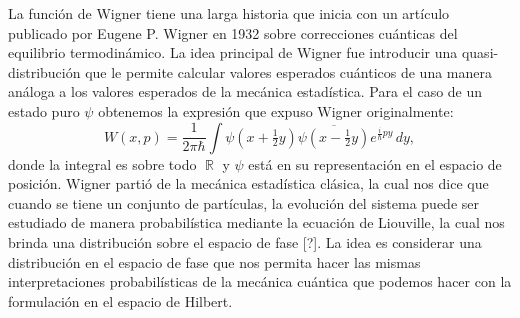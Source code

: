 \documentclass[a4paper]{report}
\DeclareMathOperator{\R}{\mathbb{R}}
\begin{document}
  La función de Wigner tiene una larga historia que inicia
  con un artículo publicado por Eugene P. Wigner en 1932
  \cite{wignerQuantumCorrectionThermodynamic1932} sobre
  correcciones cuánticas del equilibrio termodinámico. La
  idea principal de Wigner fue introducir una
  quasi-distribución que le permite calcular valores
  esperados cuánticos de una manera análoga a los valores
  esperados de la mecánica estadística. Para el caso de un
  estado puro $\psi$ obtenemos la expresión que expuso
  Wigner originalmente:
  \begin{equation}
    \label{eqn:wigners_original}
    W(x,p)
    = \frac{1}{2\pi\hbar} \int
    \psi(x+\tfrac{1}{2}y)\overline{\psi(x-\tfrac{1}{2}y)}
    e^{\frac{i}{\hbar} p y} \, dy,
  \end{equation}
  donde la integral es sobre todo $\R$ y $\psi$ está en su
  representación en el espacio de posición. Wigner partió de
  la mecánica estadística clásica, la cual nos dice que
  cuando se tiene un conjunto de partículas, la evolución
  del sistema puede ser estudiado de manera probabilística
  mediante la ecuación de Liouville, la cual nos brinda una
  distribución sobre el espacio de fase [?]. La idea es
  considerar una distribución en el espacio de fase que nos
  permita hacer las mismas interpretaciones probabilísticas
  de la mecánica cuántica que podemos hacer con la
  formulación en el espacio de Hilbert.
\end{document}

